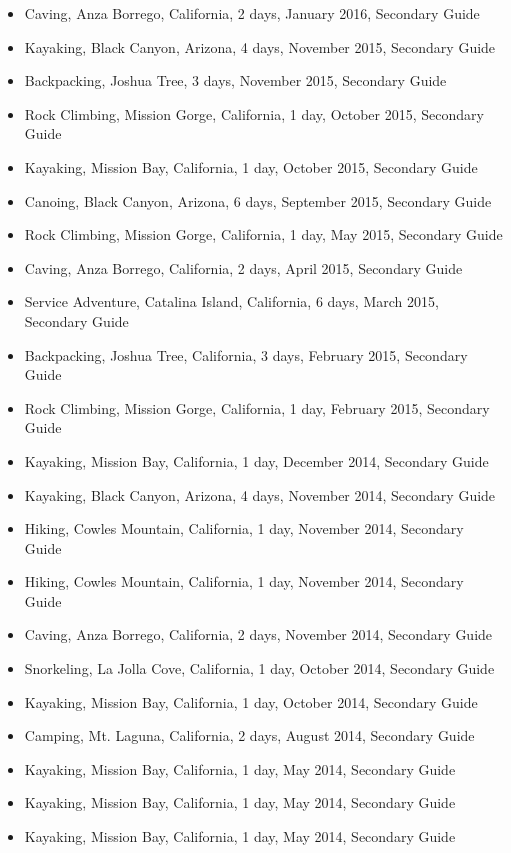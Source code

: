 \documentclass[line,margin]{res}
\begin{document}
\begin{resume}
\begin{itemize}
		\item Caving, Anza Borrego, California, 2 days, January 2016, Secondary Guide
		\item Kayaking, Black Canyon, Arizona, 4 days, November 2015, Secondary Guide
		\item Backpacking, Joshua Tree, 3 days, November 2015, Secondary Guide
		\item Rock Climbing, Mission Gorge, California, 1 day, October 2015, Secondary Guide
		\item Kayaking, Mission Bay, California, 1 day, October 2015, Secondary Guide
		\item Canoing, Black Canyon, Arizona, 6 days, September 2015, Secondary Guide
		\item Rock Climbing, Mission Gorge, California, 1 day, May 2015, Secondary Guide
		\item Caving, Anza Borrego, California, 2 days, April 2015, Secondary Guide
		\item Service Adventure, Catalina Island, California, 6 days, March 2015, Secondary Guide
		\item Backpacking, Joshua Tree, California, 3 days, February 2015, Secondary Guide
		\item Rock Climbing, Mission Gorge, California, 1 day, February 2015, Secondary Guide
		\item Kayaking, Mission Bay, California, 1 day, December 2014, Secondary Guide
		\item Kayaking, Black Canyon, Arizona, 4 days, November 2014, Secondary Guide
		\item Hiking, Cowles Mountain, California, 1 day, November 2014, Secondary Guide
		\item Hiking, Cowles Mountain, California, 1 day, November 2014, Secondary Guide
		\item Caving, Anza Borrego, California, 2 days, November 2014, Secondary Guide
		\item Snorkeling, La Jolla Cove, California, 1 day, October 2014, Secondary Guide
		\item Kayaking, Mission Bay, California, 1 day, October 2014, Secondary Guide
		\item Camping, Mt. Laguna, California, 2 days, August 2014, Secondary Guide
		\item Kayaking, Mission Bay, California, 1 day, May 2014, Secondary Guide
		\item Kayaking, Mission Bay, California, 1 day, May 2014, Secondary Guide
		\item Kayaking, Mission Bay, California, 1 day, May 2014, Secondary Guide

\end{itemize}
\end{resume}
\end{document}
